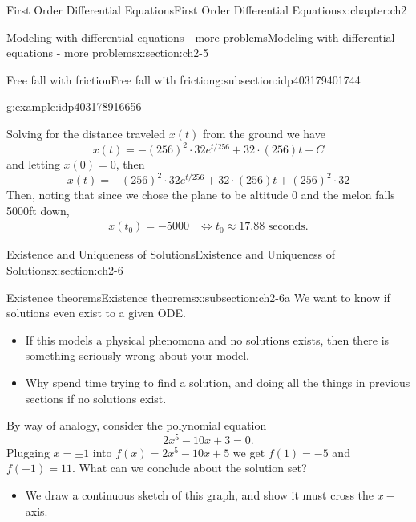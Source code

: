 \documentclass[oneside,10pt,]{book}
\numberwithin{equation}{section}
\numberwithin{equation}{section}
\newcommand{\amp}{&}
\begin{document}
\begin{chapterptx}{First Order Differential Equations}{}{First Order Differential Equations}{}{}{x:chapter:ch2}
\begin{sectionptx}{Modeling with differential equations - more problems}{}{Modeling with differential equations - more problems}{}{}{x:section:ch2-5}
\begin{subsectionptx}{Free fall with friction}{}{Free fall with friction}{}{}{g:subsection:idp403179401744}
\begin{example}{}{g:example:idp403178916656}
%
\par
Solving for the distance traveled \(x(t)\) from the ground we have%
\begin{equation*}
x(t)=-\left(256\right)^{2}\cdot32e^{t/256}+32\cdot\left(256\right)t+C
\end{equation*}
and letting \(x(0)=0\), then%
\begin{equation*}
x(t)=-\left(256\right)^{2}\cdot32e^{t/256}+32\cdot\left(256\right)t+\left(256\right)^{2}\cdot32
\end{equation*}
Then, noting that since we chose the plane to be altitude 0 and the melon falls 5000ft down,%
\begin{align*}
x(t_{0})=-5000 \amp \iff t_{0}\approx17.88\text{ seconds.}
\end{align*}
%
\end{example}
\end{subsectionptx}
\end{sectionptx}
%
%
\typeout{************************************************}
\typeout{************************************************}
%
\begin{sectionptx}{Existence and Uniqueness of Solutions}{}{Existence and Uniqueness of Solutions}{}{}{x:section:ch2-6}
%
%
\typeout{************************************************}
\typeout{************************************************}
%
\begin{subsectionptx}{Existence theorems}{}{Existence theorems}{}{}{x:subsection:ch2-6a}
We want to know if solutions even exist to a given ODE.%
%
\begin{itemize}[label=\textbullet]
\item{}If this models a physical phenomona and no solutions exists, then there is something seriously wrong about your model.%
\item{}Why spend time trying to find a solution, and doing all the things in previous sections if no solutions exist.%
\end{itemize}
By way of analogy, consider the polynomial equation%
\begin{equation*}
2x^{5}-10x+3=0.
\end{equation*}
Plugging \(x=\pm1\) into \(f(x)=2x^{5}-10x+5\) we get \(f(1)=-5\) and \(f(-1)=11\). What can we conclude about the solution set?%
%
\begin{itemize}[label=\textbullet]
\item{}We draw a continuous sketch of this graph, and show it must cross the \(x-\)axis.%

\end{itemize}
\end{subsectionptx}
\end{sectionptx}
\end{chapterptx}
\end{document}
